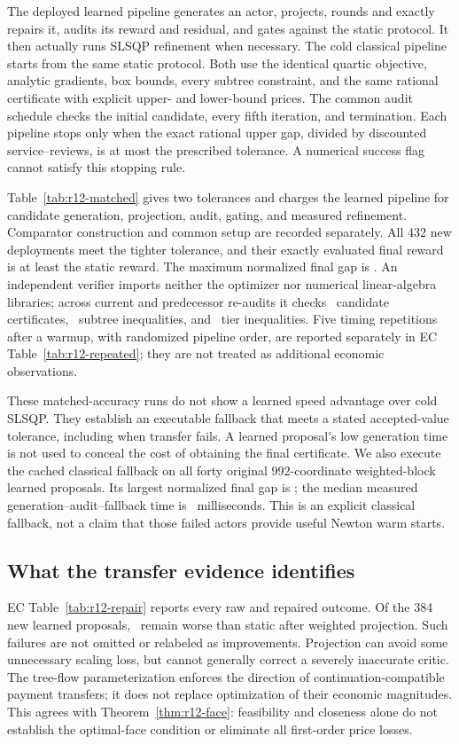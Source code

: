 The deployed learned pipeline generates an actor, projects, rounds and exactly repairs it, audits its reward and residual, and gates against the static protocol. It then actually runs SLSQP refinement when necessary. The cold classical pipeline starts from the same static protocol. Both use the identical quartic objective, analytic gradients, box bounds, every subtree constraint, and the same rational certificate with explicit upper- and lower-bound prices. The common audit schedule checks the initial candidate, every fifth iteration, and termination. Each pipeline stops only when the exact rational upper gap, divided by discounted service--reviews, is at most the prescribed tolerance. A numerical success flag cannot satisfy this stopping rule.

Table~\ref{tab:r12-matched} gives two tolerances and charges the learned pipeline for candidate generation, projection, audit, gating, and measured refinement. Comparator construction and common setup are recorded separately. All 432 new deployments meet the tighter tolerance, and their exactly evaluated final reward is at least the static reward. The maximum normalized final gap is \RtwFinalGap. An independent verifier imports neither the optimizer nor numerical linear-algebra libraries; across current and predecessor re-audits it checks \RtwCertificates\ candidate certificates, \RtwSubtrees\ subtree inequalities, and \RtwTiers\ tier inequalities. Five timing repetitions after a warmup, with randomized pipeline order, are reported separately in EC Table~\ref{tab:r12-repeated}; they are not treated as additional economic observations.

These matched-accuracy runs do not show a learned speed advantage over cold SLSQP. They establish an executable fallback that meets a stated accepted-value tolerance, including when transfer fails. A learned proposal's low generation time is not used to conceal the cost of obtaining the final certificate. We also execute the cached classical fallback on all forty original 992-coordinate weighted-block learned proposals. Its largest normalized final gap is \RtwLargeGap; the median measured generation--audit--fallback time is \RtwLargeMedianMs\ milliseconds. This is an explicit classical fallback, not a claim that those failed actors provide useful Newton warm starts.

\subsection{What the transfer evidence identifies}
EC Table~\ref{tab:r12-repair} reports every raw and repaired outcome. Of the 384 new learned proposals, \RtwRawNegative\ remain worse than static after weighted projection. Such failures are not omitted or relabeled as improvements. Projection can avoid some unnecessary scaling loss, but cannot generally correct a severely inaccurate critic. The tree-flow parameterization enforces the direction of continuation-compatible payment transfers; it does not replace optimization of their economic magnitudes. This agrees with Theorem~\ref{thm:r12-face}: feasibility and closeness alone do not establish the optimal-face condition or eliminate all first-order price losses.


